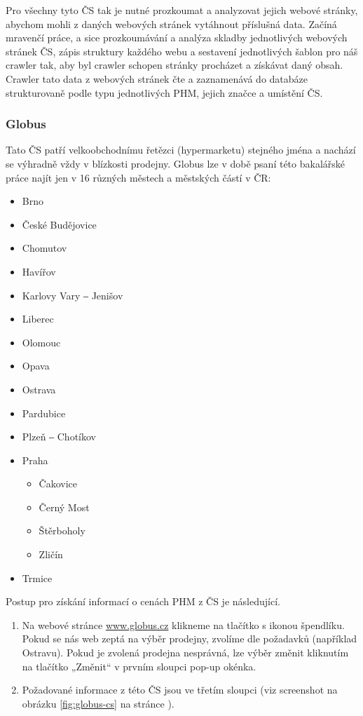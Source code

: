Pro všechny tyto ČS tak je nutné prozkoumat a analyzovat jejich webové
stránky, abychom mohli z daných webových stránek vytáhnout příslušná data.
Začíná mravenčí práce, a sice prozkoumávání a analýza skladby jednotlivých
webových stránek ČS, zápis struktury každého webu a sestavení jednotlivých
šablon pro náš crawler tak, aby byl crawler schopen stránky procházet
a získávat daný obsah. Crawler tato data z webových stránek čte a zaznamenává
do databáze strukturovaně podle typu jednotlivých PHM, jejich značce
a umístění ČS.

\subsubsection{Globus}

Tato ČS patří velkoobchodnímu řetězci (hypermarketu) stejného jména
a nachází se výhradně vždy v blízkosti prodejny. Globus lze v době
psaní této bakalářské práce najít jen v 16 různých městech a městských
částí v ČR:

\begin{itemize}
    \item Brno
    \item České Budějovice
    \item Chomutov
    \item Havířov
    \item Karlovy Vary ‒ Jenišov
    \item Liberec
    \item Olomouc
    \item Opava
    \item Ostrava
    \item Pardubice
    \item Plzeň ‒ Chotíkov
    \item Praha
    \begin{itemize}
        \item Čakovice
        \item Černý Most
        \item Štěrboholy
        \item Zličín
    \end{itemize}
    \item Trmice
\end{itemize}

Postup pro získání informací o cenách PHM z ČS je následující.

\begin{enumerate}
    \item Na webové stránce \url{www.globus.cz} klikneme na tlačítko s ikonou
        špendlíku. Pokud se nás web zeptá na výběr prodejny, zvolíme
        dle požadavků (například Ostravu). Pokud je zvolená prodejna
        nesprávná, lze výběr změnit kliknutím na tlačítko „Změnit“
        v prvním sloupci pop-up okénka.
    \item Požadované informace z této ČS jsou ve třetím sloupci (viz
        screenshot na obrázku \ref{fig:globus-cs} na stránce
        \pageref{fig:globus-cs}).
\end{enumerate}

